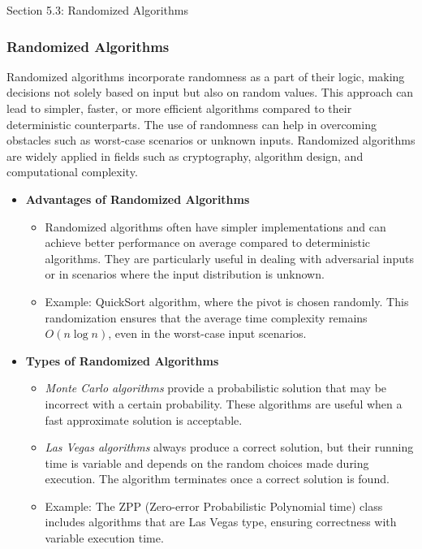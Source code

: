 \begin{notes}{Section 5.3: Randomized Algorithms}
    \subsubsection*{Randomized Algorithms}

    Randomized algorithms incorporate randomness as a part of their logic, making decisions not solely based on input but also on random values. This approach can lead to simpler, faster, or more 
    efficient algorithms compared to their deterministic counterparts. The use of randomness can help in overcoming obstacles such as worst-case scenarios or unknown inputs. Randomized algorithms are 
    widely applied in fields such as cryptography, algorithm design, and computational complexity.
    
    \begin{itemize}
        \item \textbf{Advantages of Randomized Algorithms}
        \begin{itemize}
            \item Randomized algorithms often have simpler implementations and can achieve better performance on average compared to deterministic algorithms. They are particularly useful in dealing 
            with adversarial inputs or in scenarios where the input distribution is unknown.
            \item Example: QuickSort algorithm, where the pivot is chosen randomly. This randomization ensures that the average time complexity remains $O(n \log n)$, even in the worst-case input 
            scenarios.
        \end{itemize}
        
        \item \textbf{Types of Randomized Algorithms}
        \begin{itemize}
            \item \emph{Monte Carlo algorithms} provide a probabilistic solution that may be incorrect with a certain probability. These algorithms are useful when a fast approximate solution is 
            acceptable.
            \item \emph{Las Vegas algorithms} always produce a correct solution, but their running time is variable and depends on the random choices made during execution. The algorithm terminates 
            once a correct solution is found.
            \item Example: The ZPP (Zero-error Probabilistic Polynomial time) class includes algorithms that are Las Vegas type, ensuring correctness with variable execution time.
        \end{itemize}
    \end{itemize}


\end{notes}
